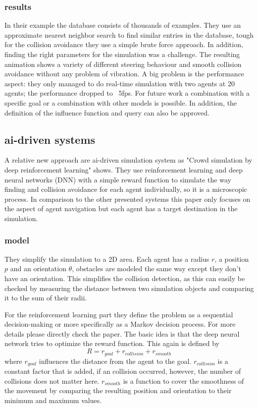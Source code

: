 \documentclass{acmsiggraph}               %
\begin{document}
\subsubsection{results}
In their example the database consists of thousands of examples. They use an approximate nearest neighbor search to find similar entries in the database, tough for the collision avoidance they use a simple brute force approach. In addition, finding the right parameters for the simulation was a challenge.
The resulting animation shows a variety of different steering behaviour and smooth collision avoidance without any problem of vibration.  
A big problem is the performance aspect: they only managed to do real-time simulation with two agents at 20 agents; the performance dropped to ~5fps. 
For future work a combination with a specific goal or a combination with other models is possible. In addition, the definition of the influence function and query can also be approved.

\subsection{ai-driven systems}
A relative new approach are ai-driven simulation system as "Crowd simulation by deep reinforcement learning" \cite{lee_crowd_2018} shows. They use reinforcement learning and deep neural networks (DNN) with a simple reward function to simulate the way finding and collision avoidance for each agent individually, so it is a microscopic process. In comparison to the other presented systems this paper only focuses on the aspect of agent navigation but each agent has a target destination in the simulation.

\subsubsection{model}
They simplify the simulation to a 2D area. Each agent has a radius $r$, a position $p$ and an orientation $\theta$, obstacles are modeled the same way except they don't have an orientation. 
This simplifies the collision detection, as this can easily be checked by measuring the distance between two simulation objects and comparing it to the sum of their radii.

For the reinforcement learning part they define the problem as a sequential decision-making or more specifically as a Markov decision process. For more details please directly check the paper. The basic idea is that the deep neural network tries to optimize the reward function. This again is defined by 
\begin{equation}
R = r_{goal} + r_{collision} + r_{smooth}
\end{equation}
where $r_{goal}$ influences the distance from the agent to the goal. $r_{collision}$ is a constant factor that is added, if an collision occurred, however, the number of collisions does not matter here. $r_{smooth}$ is a function to cover the smoothness of the movement by comparing the resulting position and orientation to their minimum and maximum values.  
\end{document}
